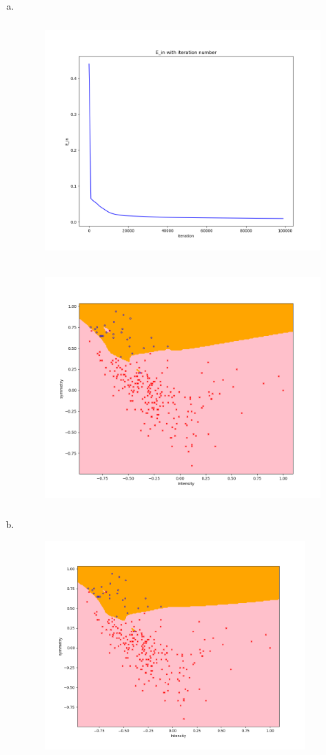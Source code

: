 \documentclass[11pt]{article}
\begin{document}
\begin{enumerate} [(a)]
	\item\  \begin{figure}[htb] 
			{\includegraphics[height=9cm]{p2a1.png}}
	\end{figure}
	\newpage
	\begin{figure}[htb] 
			{\includegraphics[height=9cm]{p2a2.png}}
	\end{figure}
	\item \ \begin{figure}[htb] 
			{\includegraphics[height=8cm]{p2b.png}}

\end{figure}
\end{enumerate}
\end{document}
